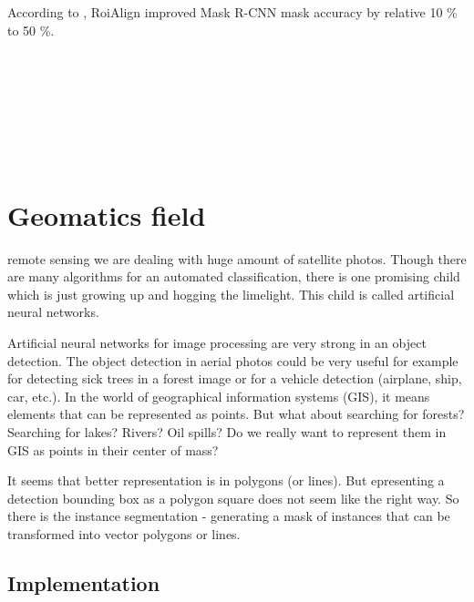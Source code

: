 \documentclass[journal, onecolumn, a4paper]{IEEEtran}
\begin{document}
According to \cite{mask-rcnn}, RoiAlign improved Mask R-CNN mask accuracy by relative 10 \% to 50 \%. 

\ 

\ 

\ 

\ 

\section{Geomatics field}

 remote sensing we are dealing with huge amount of satellite photos. Though there are many algorithms for an automated classification, there is one promising child which is just growing up and hogging the limelight. This child is called artificial neural networks. 

Artificial neural networks for image processing are very strong in an object detection. The object detection in aerial photos could be very useful for example for detecting sick trees in a forest image or for a vehicle detection (airplane, ship, car, etc.). In the world of geographical information systems (GIS), it means elements that can be represented as points. But what about searching for forests? Searching for lakes? Rivers? Oil spills? Do we really want to represent them in GIS as points in their center of mass? 

It seems that better representation is in polygons (or lines). But epresenting a detection bounding box as a polygon square does not seem like the right way. So there is the instance segmentation - generating a mask of instances that can be transformed into vector polygons or lines. 

\subsection{Implementation}
\end{document}
